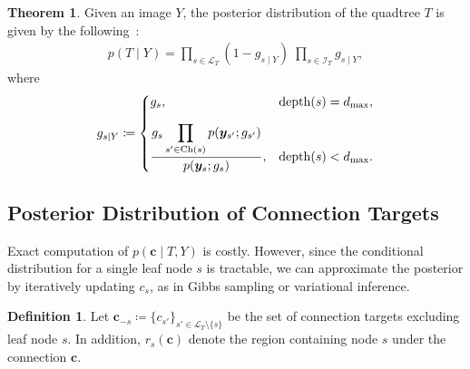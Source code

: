 \documentclass[conference]{IEEEtran}
\theoremstyle{definition}
\newtheorem{defi}{Definition}
\newtheorem{thm}{Theorem}
\begin{document}
\begin{thm}
  Given an image $Y$, the posterior distribution of the quadtree $T$ is given by the following~\cite{wang_isita2024, nakahara_quadtree}:
  \begin{align}
    p(T\mid Y)
    = \prod_{s\in\mathcal{L}_T}(1 - g_{s\mid Y})
      \;\prod_{s\in\mathcal{I}_T} g_{s\mid Y},
    \label{m's posterior}
  \end{align}
  where
  \begin{eqnarray}
    g_{s\mid Y}\coloneqq
    \begin{dcases}
      g_{s}, & \mathrm{depth}(s) = d_{\mathrm{max}},\\[6pt]
      \displaystyle\frac{g_{s}
        \displaystyle\prod_{s'\in \mathrm{Ch}(s)}p(\bm{y}_{s'}; g_{s'})}
        {p(\bm{y}_{s}; g_s)}, & \mathrm{depth}(s) < d_{\mathrm{max}}.
    \end{dcases}
  \end{eqnarray}
  \label{posterior_dist_T}
\end{thm}

\subsection{Posterior Distribution of Connection Targets}

Exact computation of $p(\bm{c} \mid T, Y)$ is costly.
However, since the conditional distribution for a single leaf node $s$ is tractable, we can approximate the posterior by iteratively updating $c_s$, as in Gibbs sampling or variational inference.

\begin{defi}
  Let $\bm{c}_{-s} \coloneqq \{c_{s'}\}_{s'\in\mathcal{L}_T\setminus \{s\}}$ be the set of connection targets excluding leaf node $s$. In addition,  $r_s(\bm{c})$ denote the region containing node $s$ under the connection $\bm{c}$.
\end{defi}
\end{document}
